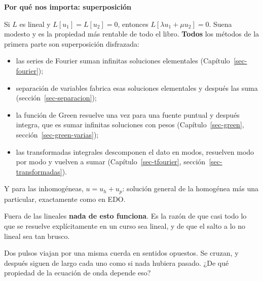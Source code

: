 \documentclass[
  spanish,
  a4paper,
]{scrbook}
\providecommand{\tightlist}{%
  \setlength{\itemsep}{0pt}\setlength{\parskip}{0pt}}
\theoremstyle{definition}
\theoremstyle{plain}
\theoremstyle{definition}
\theoremstyle{plain}
\theoremstyle{definition}
\theoremstyle{remark}
\begin{document}
\begin{tcolorbox}[enhanced jigsaw, arc=.35mm, bottomrule=.15mm, breakable, colback=white, colframe=quarto-callout-tip-color-frame, left=2mm, leftrule=.75mm, opacityback=0, rightrule=.15mm, toprule=.15mm]
\begin{minipage}[t]{5.5mm}
\textcolor{quarto-callout-tip-color}{\faLightbulb}
\end{minipage}%
\begin{minipage}[t]{\textwidth - 5.5mm}

\vspace{-3mm}\textbf{Por qué nos importa: superposición}\vspace{3mm}

Si \(L\) es lineal y \(L[u_1] = L[u_2] = 0\), entonces
\(L[\lambda u_1 + \mu u_2] = 0\). Suena modesto y es la propiedad más
rentable de todo el libro. \textbf{Todos} los métodos de la primera
parte son superposición disfrazada:

\begin{itemize}
\tightlist
\item
  las series de Fourier suman infinitas soluciones elementales
  (Capítulo~\ref{sec-fourier});
\item
  separación de variables fabrica esas soluciones elementales y después
  las suma (sección~\ref{sec-separacion});
\item
  la función de Green resuelve una vez para una fuente puntual y después
  integra, que es sumar infinitas soluciones con pesos
  (Capítulo~\ref{sec-green}, sección~\ref{sec-green-varias});
\item
  las transformadas integrales descomponen el dato en modos, resuelven
  modo por modo y vuelven a sumar (Capítulo~\ref{sec-tfourier},
  sección~\ref{sec-transformadas}).
\end{itemize}

Y para las inhomogéneas, \(u = u_h + u_p\): solución general de la
homogénea más una particular, exactamente como en EDO.

Fuera de las lineales \textbf{nada de esto funciona}. Es la razón de que
casi todo lo que se resuelve explícitamente en un curso sea lineal, y de
que el salto a lo no lineal sea tan brusco.

\end{minipage}%
\end{tcolorbox}

Dos pulsos viajan por una misma cuerda en sentidos opuestos. Se cruzan,
y después siguen de largo cada uno como si nada hubiera pasado. ¿De qué
propiedad de la ecuación de onda depende eso?
\end{document}

